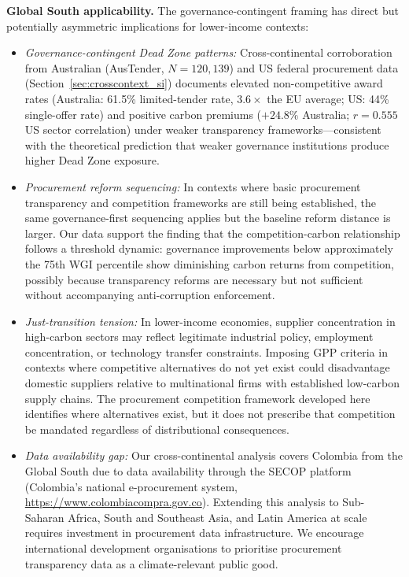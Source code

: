 \documentclass[11pt]{article}
\begin{document}
\textbf{Global South applicability.} The governance-contingent framing has direct but potentially asymmetric implications for lower-income contexts:
\begin{itemize}
\item \textit{Governance-contingent Dead Zone patterns:} Cross-continental corroboration from Australian (AusTender, $N = 120{,}139$) and US federal procurement data (Section~\ref{sec:crosscontext_si}) documents elevated non-competitive award rates (Australia: 61.5\% limited-tender rate, $3.6\times$ the EU average; US: 44\% single-offer rate) and positive carbon premiums ($+24.8\%$ Australia; $r = 0.555$ US sector correlation) under weaker transparency frameworks---consistent with the theoretical prediction that weaker governance institutions produce higher Dead Zone exposure.
\item \textit{Procurement reform sequencing:} In contexts where basic procurement transparency and competition frameworks are still being established, the same governance-first sequencing applies but the baseline reform distance is larger. Our data support the finding that the competition-carbon relationship follows a threshold dynamic: governance improvements below approximately the 75th WGI percentile show diminishing carbon returns from competition, possibly because transparency reforms are necessary but not sufficient without accompanying anti-corruption enforcement.
\item \textit{Just-transition tension:} In lower-income economies, supplier concentration in high-carbon sectors may reflect legitimate industrial policy, employment concentration, or technology transfer constraints. Imposing GPP criteria in contexts where competitive alternatives do not yet exist could disadvantage domestic suppliers relative to multinational firms with established low-carbon supply chains. The procurement competition framework developed here identifies where alternatives exist, but it does not prescribe that competition be mandated regardless of distributional consequences.
\item \textit{Data availability gap:} Our cross-continental analysis covers Colombia from the Global South due to data availability through the SECOP platform (Colombia's national e-procurement system, \url{https://www.colombiacompra.gov.co}). Extending this analysis to Sub-Saharan Africa, South and Southeast Asia, and Latin America at scale requires investment in procurement data infrastructure. We encourage international development organisations to prioritise procurement transparency data as a climate-relevant public good.
\end{itemize}
\end{document}
